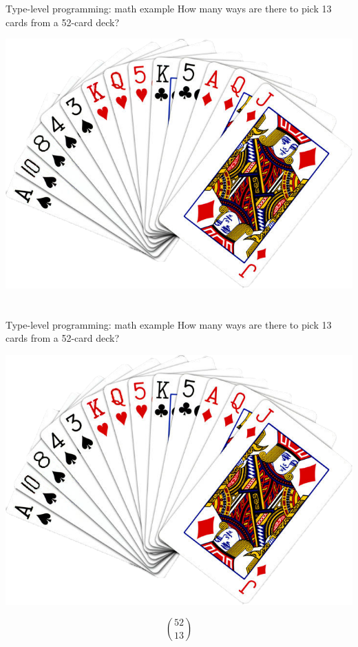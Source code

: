 \documentclass[10pt]{beamer}
\newenvironment{slide}[2][]
  {\begin{frame}[fragile,environment=slide,#1]{#2}}
  {\end{frame}}
\begin{document}
\begin{slide}{Type-level programming: math example}
\Large
How many ways are there to pick 13 cards from a 52-card deck?
\begin{center}
\begin{minipage}{0.6\textwidth}
\includegraphics[width=\textwidth]{figures/cards.png}
\end{minipage}
\begin{minipage}{0.2\textwidth}
$$
\phantom{binom{52}{13}}
$$
\end{minipage}
\end{center}
\end{slide}

\begin{slide}{Type-level programming: math example}
\Large
How many ways are there to pick 13 cards from a 52-card deck?
\begin{center}
\begin{minipage}{0.6\textwidth}
\includegraphics[width=\textwidth]{figures/cards.png}
\end{minipage}
\begin{minipage}{0.2\textwidth}
$$
\binom{52}{13}
$$
\end{minipage}
\end{center}
\end{slide}
\end{document}
